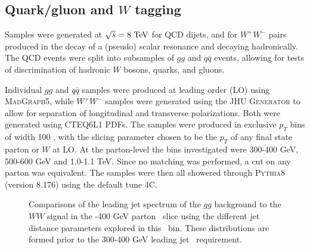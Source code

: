 \subsection{Quark/gluon and $W$ tagging}

Samples were generated at $\sqrt{s} = 8\TeV$ for QCD dijets, and for $W^+W^-$
pairs produced in the decay of a (pseudo) scalar resonance and
decaying hadronically. The QCD events
were split into subsamples of $gg$ and $q\bar{q}$ events, allowing for tests of
discrimination of hadronic $W$ bosons, quarks, and gluons.

Individual $gg$ and $q\bar{q}$ samples were produced at leading order (LO)
using \textsc{MadGraph5}, while $W^+W^-$ samples were generated using
the \textsc{JHU Generator} to allow for separation of longitudinal and
transverse polarizations. Both were generated using \textsc{CTEQ6L1}
PDFs. The samples were produced in exclusive $p_T$ bins
of width 100 {\GeV}, with the slicing parameter
chosen to be the $p_T$ of any final state parton or $W$ at LO. At the
parton-level the \pt bins investigated were 300-400 GeV, 500-600 GeV
and 1.0-1.1 TeV. Since
no matching was performed, a cut on any parton was equivalent. The samples were
then all showered through \textsc{Pythia8} (version 8.176) using the default tune 4C.



\begin{figure}
\begin{center}
\caption{Comparisons of the leading jet \pt spectrum of the $gg$
  background to the $WW$ signal in the -400 GeV parton \pt~slice using the
  different \antikt jet distance parameters explored in this \pt~bin. These
  distributions are formed prior to the 300-400 GeV leading jet \pt~requirement.}
\label{fig:pt300_basics}
\end{center}
\end{figure}




